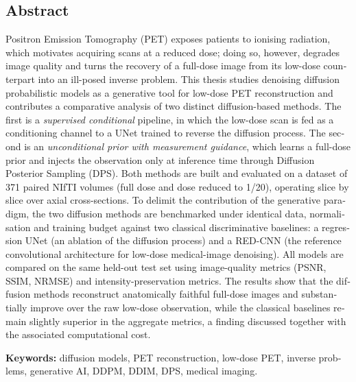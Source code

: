 \begin{otherlanguage}{english}
\chapter*{Abstract}

Positron Emission Tomography (PET) exposes patients to ionising
radiation, which motivates acquiring scans at a reduced dose; doing so,
however, degrades image quality and turns the recovery of a full-dose
image from its low-dose counterpart into an ill-posed inverse problem.
This thesis studies denoising diffusion probabilistic models as a
generative tool for low-dose PET reconstruction and contributes a
comparative analysis of two distinct diffusion-based methods. The first
is a \emph{supervised conditional} pipeline, in which the low-dose scan
is fed as a conditioning channel to a UNet trained to reverse the
diffusion process. The second is an \emph{unconditional prior with
measurement guidance}, which learns a full-dose prior and injects the
observation only at inference time through Diffusion Posterior Sampling
(DPS). Both methods are built and evaluated on a dataset of 371 paired
NIfTI volumes (full dose and dose reduced to 1/20), operating slice by
slice over axial cross-sections. To delimit the contribution of the
generative paradigm, the two diffusion methods are benchmarked under
identical data, normalisation and training budget against two classical
discriminative baselines: a regression UNet (an ablation of the
diffusion process) and a RED-CNN (the reference convolutional
architecture for low-dose medical-image denoising). All models are
compared on the same held-out test set using image-quality metrics
(PSNR, SSIM, NRMSE) and intensity-preservation metrics. The results show
that the diffusion methods reconstruct anatomically faithful full-dose
images and substantially improve over the raw low-dose observation,
while the classical baselines remain slightly superior in the aggregate
metrics, a finding discussed together with the associated computational
cost.

\vspace{1em}
\noindent\textbf{Keywords:} diffusion models, PET reconstruction,
low-dose PET, inverse problems, generative AI, DDPM, DDIM, DPS,
medical imaging.

\end{otherlanguage}

